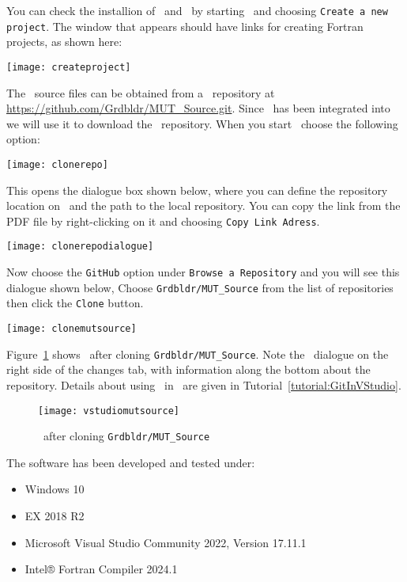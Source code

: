 You can check the installion of \vstudio\ and \ifort\ by starting \vstudio\ and choosing \texttt{Create a new project}.  The window that appears should have  links for creating Fortran projects, as shown here:

\texttt{[image: createproject]}

The \mut\ source files can be obtained from a \github\ repository at \url{https://github.com/Grdbldr/MUT_Source.git}.  Since \github\ has been integrated into \vstudio\, we will use it to download the \mut\ repository.  When you start \vstudio\, choose the following option: 

\texttt{[image: clonerepo]}

This opens the dialogue box shown below, where you can define the repository location on \github\ and the path to the local repository.  You can copy the link from the PDF file by right-clicking on it and choosing \texttt{Copy Link Adress}.

\texttt{[image: clonerepodialogue]}

Now choose the \texttt{GitHub} option under \texttt{Browse a Repository} and you will see this dialogue shown below, Choose \texttt{Grdbldr/MUT\_Source} from the list of repositories then click the \texttt{Clone} button.

  \texttt{[image: clonemutsource]}

Figure~\ref{fig:vstudiomutsource} shows \vstudio\ after cloning \texttt{Grdbldr/MUT\_Source}. Note the \github\ dialogue on the right side of the changes tab, with information along the bottom about the repository.  Details about using \github\ in \vstudio\ are given in Tutorial~\ref{tutorial:GitInVStudio}. \\
\begin{figure}
    \texttt{[image: vstudiomutsource]}
    \caption{\vstudio\ after cloning \texttt{Grdbldr/MUT\_Source}}
    \label{fig:vstudiomutsource}
\end{figure}

The software has been developed and tested under:
\begin{itemize} 
    \item Windows 10
    \item {} EX 2018 R2
    \item Microsoft Visual Studio Community 2022, Version 17.11.1
    \item Intel® Fortran Compiler   2024.1
\end{itemize}